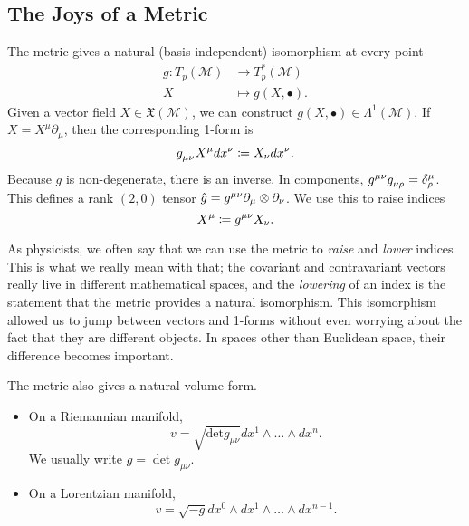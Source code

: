 \subsection{The Joys of a Metric}%
\label{sub:the_joys_of_a_metric}

The metric gives a natural (basis independent) isomorphism at every point
\begin{equation}
  \begin{split}
    g \colon T_p(\mathcal{M}) &\to T^*_{p}(\mathcal{M}) \\
    X &\mapsto g(X, \bullet).
  \end{split}
\end{equation}
Given a vector field $X \in \mathfrak{X}(\mathcal{M})$, we can construct $g(X, \bullet) \in \Lambda^1(\mathcal{M})$.
If $X = X^\mu \partial_\mu$, then the corresponding 1-form is
\begin{equation}
  g \indices{_\mu_\nu} X^\mu dx^\nu \coloneqq X_\nu dx^\nu.
\end{equation}
Because $g$ is non-degenerate, there is an inverse. In components, $g^{\mu\nu} g \indices{_\nu_\rho} = \delta^\mu_\rho$.
This defines a rank $(2, 0)$ tensor $\hat g = g \indices{^\mu^\nu} \partial_\mu \otimes \partial_\nu$. We use this to raise indices
\begin{equation}
  X^\mu \coloneqq g \indices{^\mu^\nu} X_\nu.
\end{equation}
\begin{leftbar}
  \begin{remark}
    As physicists, we often say that we can use the metric to \emph{raise} and \emph{lower} indices.
    This is what we really mean with that; the covariant and contravariant vectors really live in different mathematical spaces, and the \emph{lowering} of an index is the statement that the metric provides a natural isomorphism.
    This isomorphism allowed us to jump between vectors and 1-forms without even worrying about the fact that they are different objects. In spaces other than Euclidean space, their difference becomes important.
  \end{remark}
\end{leftbar}

The metric also gives a natural volume form. 
\begin{itemize}
  \item On a Riemannian manifold, 
  \begin{equation}
    v = \sqrt{\text{det}g_{\mu\nu}} dx^1 \wedge \dots \wedge dx^n.
  \end{equation}
  We usually write $g = \det g_{\mu\nu}$.
  \item On a Lorentzian manifold, 
    \begin{equation}
      v = \sqrt{-g} dx^0 \wedge dx^1 \wedge \dots \wedge dx^{n-1}.
    \end{equation}
\end{itemize}

